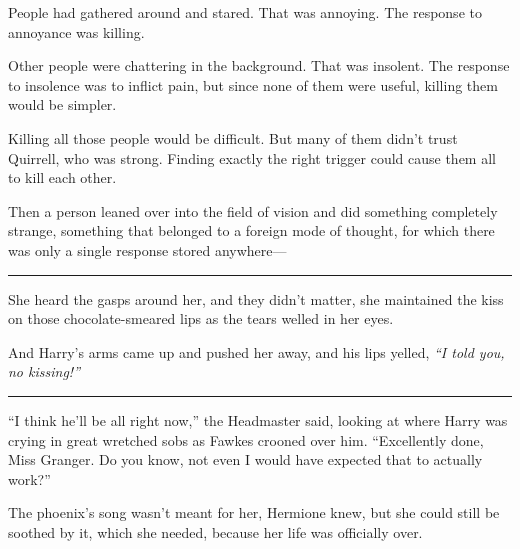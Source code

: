 People had gathered around and stared. That was annoying. The response
to annoyance was killing.

Other people were chattering in the background. That was insolent. The
response to insolence was to inflict pain, but since none of them were
useful, killing them would be simpler.

Killing all those people would be difficult. But many of them didn't
trust Quirrell, who was strong. Finding exactly the right trigger could
cause them all to kill each other.

Then a person leaned over into the field of vision and did something
completely strange, something that belonged to a foreign mode of
thought, for which there was only a single response stored anywhere---

\begin{center}\rule{3in}{0.4pt}\end{center}

She heard the gasps around her, and they didn't matter, she maintained
the kiss on those chocolate-smeared lips as the tears welled in her
eyes.

And Harry's arms came up and pushed her away, and his lips yelled,
\emph{``I told you, no kissing!''}

\begin{center}\rule{3in}{0.4pt}\end{center}

``I think he'll be all right now,'' the Headmaster said, looking at
where Harry was crying in great wretched sobs as Fawkes crooned over
him. ``Excellently done, Miss Granger. Do you know, not even I would
have expected that to actually work?''

The phoenix's song wasn't meant for her, Hermione knew, but she could
still be soothed by it, which she needed, because her life was
officially over.
